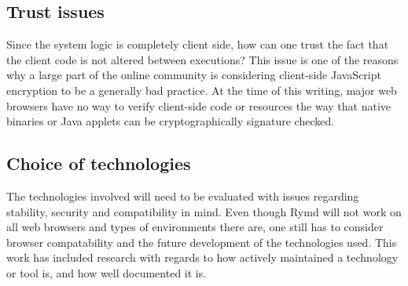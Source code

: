 \subsection{Trust issues}
Since the system logic is completely client side, how can one trust the fact that the client code is not altered between executions? This issue is one of the reasons why a large part of the online community is considering client-side JavaScript encryption to be a generally bad practice. At the time of this writing, major web browsers have no way to verify client-side code or resources the way that native binaries or Java applets can be cryptographically signature checked.

\subsection{Choice of technologies}
The technologies involved will need to be evaluated with issues regarding stability, security and compatibility in mind. Even though Rymd will not work on all web browsers and types of environments there are, one still has to consider browser compatability and the future development of the technologies used. This work has included research with regards to how actively maintained a technology or tool is, and how well documented it is.
